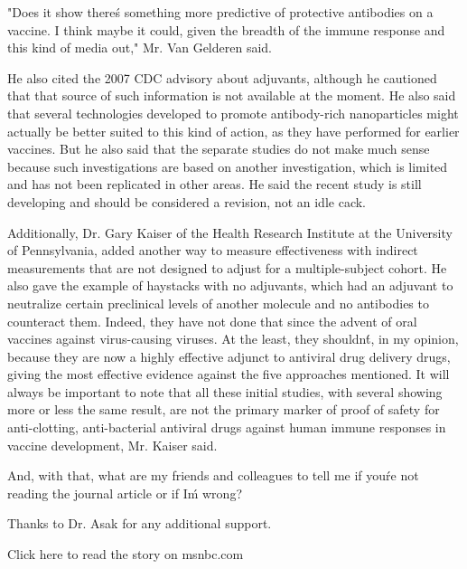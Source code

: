 \documentclass{article}
\begin{document}
"Does it show there\'s something more predictive of protective antibodies on a vaccine. I think maybe it could, given the breadth of the immune response and this kind of media out," Mr. Van Gelderen said.

He also cited the 2007 CDC advisory about adjuvants, although he cautioned that that source of such information is not available at the moment. He also said that several technologies developed to promote antibody-rich nanoparticles might actually be better suited to this kind of action, as they have performed for earlier vaccines. But he also said that the separate studies do not make much sense because such investigations are based on another investigation, which is limited and has not been replicated in other areas. He said the recent study is still developing and should be considered a revision, not an idle cack.

Additionally, Dr. Gary Kaiser of the Health Research Institute at the University of Pennsylvania, added another way to measure effectiveness with indirect measurements that are not designed to adjust for a multiple-subject cohort. He also gave the example of haystacks with no adjuvants, which had an adjuvant to neutralize certain preclinical levels of another molecule and no antibodies to counteract them. Indeed, they have not done that since the advent of oral vaccines against virus-causing viruses. At the least, they shouldn\'t, in my opinion, because they are now a highly effective adjunct to antiviral drug delivery drugs, giving the most effective evidence against the five approaches mentioned. It will always be important to note that all these initial studies, with several showing more or less the same result, are not the primary marker of proof of safety for anti-clotting, anti-bacterial antiviral drugs against human immune responses in vaccine development, Mr. Kaiser said.

And, with that, what are my friends and colleagues to tell me if you\'re not reading the journal article or if I\'m wrong?

Thanks to Dr. Asak for any additional support.

Click here to read the story on msnbc.com
\end{document}
